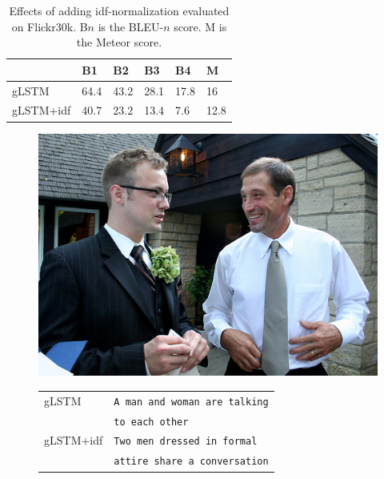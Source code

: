 \documentclass[twoside,twocolumn]{article}
\begin{document}
	\begin{table}
		\centering
		\begin{tabular}{llllll}
			~                  & B1 & B2 & B3 & B4 & M \\ \hline
			gLSTM        & 64.4   & 43.2            & 28.1   & 17.8   & 16 \\
			gLSTM+idf   & 40.7   & 23.2   & 13.4   & 7.6 & 12.8 \\ \hline
			
		\end{tabular}
		
		\caption{Effects of adding idf-normalization evaluated on Flickr30k. B$n$ is the BLEU-$n$ score. M is the Meteor score.}
		\label{table:results_idf}
	\end{table}
	
	\begin{figure}
		\centering
		\begin{minipage}[t]{.45\textwidth}
			\centering
			\vspace{0pt}
			\includegraphics[width=\textwidth]{Images/trouw}
		\end{minipage}\hfill	
		\begin{minipage}[t]{.7\textwidth}
			\vspace{0pt}
			\begin{tabular}{ll}
				gLSTM & \texttt{A man and woman are talking} \\ 
				~ & \texttt{to each other} \\
				gLSTM+idf & \texttt{Two men dressed in formal}\\
				~ & \texttt{attire share a conversation} \\
			\end{tabular}

\end{minipage}
\end{figure}
\end{document}
